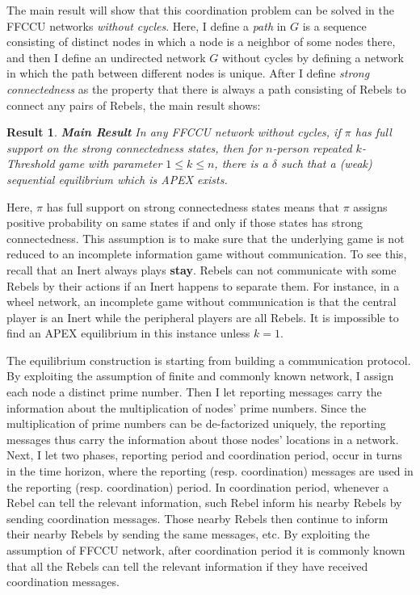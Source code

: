 \documentclass[12pt,letter]{article}
\newtheorem{result}{Result}
\theoremstyle{definition}
\theoremstyle{remark}
\theoremstyle{claim}
\begin{document}
The main result will show that this coordination problem can be solved in the FFCCU networks \textit{without cycles}. Here, I define a \textit{path} in $G$ is a sequence consisting of distinct nodes in which a node is a neighbor of some nodes there, and then I define an undirected network $G$ without cycles by defining a network in which the path between different nodes is unique. After I define \textit{strong connectedness} as the property that there is always a path consisting of Rebels to connect any pairs of Rebels,  the main result shows:

\begin{result}\textbf{Main Result}
In any FFCCU network without cycles, if $\pi$ has full support on the strong connectedness states, then for $n$-person repeated $k$-Threshold game with parameter $1\leq k \leq n$, there is a $\delta$ such that a (weak) sequential equilibrium which is APEX exists.  
\end{result}

Here, $\pi$ has full support on strong connectedness states means that $\pi$ assigns positive probability on same states if and only if those states has strong connectedness. This assumption is to make sure that the underlying game is not reduced to an incomplete information game without communication.  To see this, recall that an Inert always plays \textbf{stay}. Rebels can not communicate with some Rebels by their actions if an Inert happens to separate them. For instance, in a wheel network, an incomplete game without communication is that the central player is an Inert while the peripheral players are all Rebels. It is impossible to find an APEX equilibrium in this instance unless $k=1$.

The equilibrium construction is starting from building a communication protocol. By exploiting the assumption of finite and commonly known network, I assign each node a distinct prime number. Then I let reporting messages carry the information about the multiplication of nodes' prime numbers. Since the multiplication of prime numbers can be de-factorized uniquely, the reporting messages thus carry the information about those nodes' locations in a network. Next, I let two phases, reporting period and coordination period, occur in turns in the time horizon, where the reporting (resp. coordination) messages are used in the reporting (resp. coordination) period. In coordination period, whenever a Rebel can tell the relevant information, such Rebel inform his nearby Rebels by sending coordination messages. Those nearby Rebels then continue to inform their nearby Rebels by sending the same messages, etc. By exploiting the assumption of FFCCU network, after coordination period it is commonly known that all the Rebels can tell the relevant information if they have received coordination messages.
\end{document}
